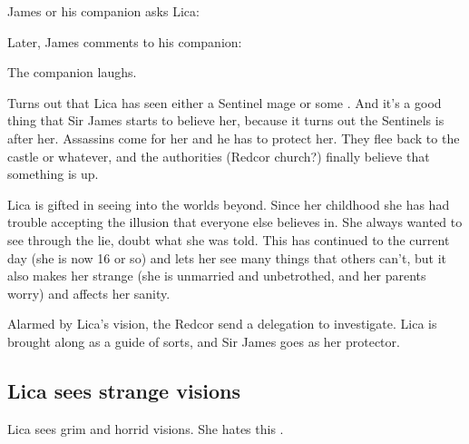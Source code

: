 \begin{garbage}
James or his companion asks Lica: 


Later, James comments to his companion: 

The companion laughs. 

Turns out that Lica has seen either a Sentinel mage or some \daemon. 
And it's a good thing that Sir James starts to believe her, because it turns out the Sentinels is after her. Assassins come for her and he has to protect her. They flee back to the castle or whatever, and the authorities (Redcor church?) finally believe that something is up. 

Lica is gifted in seeing into the worlds beyond. Since her childhood she has had trouble accepting the illusion that everyone else believes in. She always wanted to see through the lie, doubt what she was told. This has continued to the current day (she is now 16 or so) and lets her see many things that others can't, but it also makes her strange (she is unmarried and unbetrothed, and her parents worry) and affects her sanity. 

Alarmed by Lica's vision, the Redcor send a delegation to investigate. Lica is brought along as a guide of sorts, and Sir James goes as her protector. 









\subsection{Lica sees strange visions}
Lica sees grim and horrid visions. 
She hates this . 











\end{garbage}
